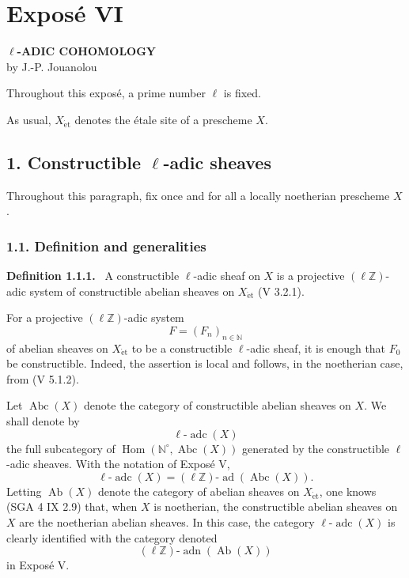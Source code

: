 \documentclass[11pt]{article}
\newenvironment{statement}[1]{\par\medskip\noindent\textbf{#1.}\ }{\par\medskip}
\DeclareMathOperator{\Hom}{Hom}
\providecommand{\Hom}{\operatorname{Hom}}
\providecommand{\adn}{\operatorname{adn}}
\providecommand{\Ab}{\operatorname{Ab}}
\providecommand{\Abc}{\operatorname{Abc}}
\providecommand{\adc}{\operatorname{adc}}
\providecommand{\ad}{\operatorname{ad}}
\providecommand{\adn}{\operatorname{adn}}
\providecommand{\Ab}{\operatorname{Ab}}
\providecommand{\Hom}{\operatorname{Hom}}
\begin{document}
\section*{Exposé VI}

\begin{center}
\textbf{\(\ell\)-ADIC COHOMOLOGY}\\[0.5em]
by J.-P. Jouanolou
\end{center}

Throughout this exposé, a prime number \(\ell\) is fixed.

As usual, \(X_{\mathrm{\acute et}}\) denotes the étale site of a prescheme \(X\).

\subsection*{1. Constructible \(\ell\)-adic sheaves}

Throughout this paragraph, fix once and for all a locally noetherian prescheme \(X\).

\subsubsection*{1.1. Definition and generalities}

\begin{statement}{Definition 1.1.1}
A constructible \(\ell\)-adic sheaf on \(X\) is a projective \((\ell\mathbb Z)\)-adic system of constructible abelian sheaves on \(X_{\mathrm{\acute et}}\) (V 3.2.1).
\end{statement}

For a projective \((\ell\mathbb Z)\)-adic system
\[
F=(F_n)_{n\in\mathbb N}
\]
of abelian sheaves on \(X_{\mathrm{\acute et}}\) to be a constructible \(\ell\)-adic sheaf, it is enough that \(F_0\) be constructible. Indeed, the assertion is local and follows, in the noetherian case, from (V 5.1.2).

Let \(\Abc(X)\) denote the category of constructible abelian sheaves on \(X\). We shall denote by
\[
\ell\text{-}\adc(X)
\]
the full subcategory of \(\Hom(\mathbb N^\circ,\Abc(X))\) generated by the constructible \(\ell\)-adic sheaves. With the notation of Exposé V,
\[
\ell\text{-}\adc(X)=(\ell\mathbb Z)\text{-}\ad(\Abc(X)).
\]
Letting \(\Ab(X)\) denote the category of abelian sheaves on \(X_{\mathrm{\acute et}}\), one knows (SGA 4 IX 2.9) that, when \(X\) is noetherian, the constructible abelian sheaves on \(X\) are the noetherian abelian sheaves. In this case, the category \(\ell\text{-}\adc(X)\) is clearly identified with the category denoted
\[
(\ell\mathbb Z)\text{-}\adn(\Ab(X))
\]
in Exposé V.
\end{document}
